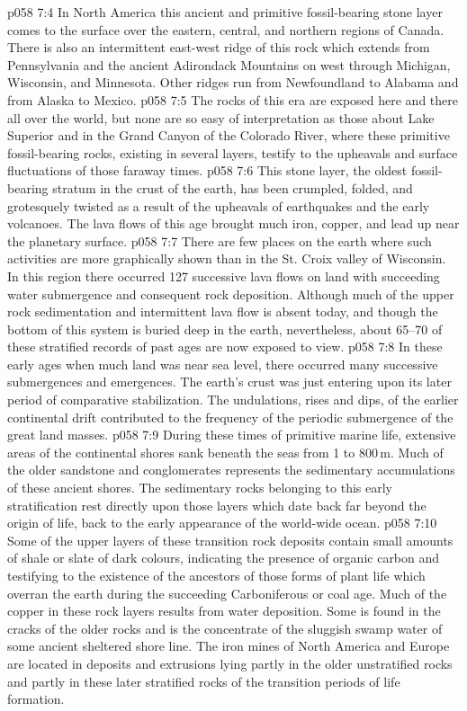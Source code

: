 \vs p058 7:4 In North America this ancient and primitive fossil\hyp{}bearing stone layer comes to the surface over the eastern, central, and northern regions of Canada. There is also an intermittent east\hyp{}west ridge of this rock which extends from Pennsylvania and the ancient Adirondack Mountains on west through Michigan, Wisconsin, and Minnesota. Other ridges run from Newfoundland to Alabama and from Alaska to Mexico.
\vs p058 7:5 The rocks of this era are exposed here and there all over the world, but none are so easy of interpretation as those about Lake Superior and in the Grand Canyon of the Colorado River, where these primitive fossil\hyp{}bearing rocks, existing in several layers, testify to the upheavals and surface fluctuations of those faraway times.
\vs p058 7:6 This stone layer, the oldest fossil\hyp{}bearing stratum in the crust of the earth, has been crumpled, folded, and grotesquely twisted as a result of the upheavals of earthquakes and the early volcanoes. The lava flows of this age brought much iron, copper, and lead up near the planetary surface.
\vs p058 7:7 There are few places on the earth where such activities are more graphically shown than in the St. Croix valley of Wisconsin. In this region there occurred 127 successive lava flows on land with succeeding water submergence and consequent rock deposition. Although much of the upper rock sedimentation and intermittent lava flow is absent today, and though the bottom of this system is buried deep in the earth, nevertheless, about 65--70 of these stratified records of past ages are now exposed to view.
\vs p058 7:8 \pc In these early ages when much land was near sea level, there occurred many successive submergences and emergences. The earth’s crust was just entering upon its later period of comparative stabilization. The undulations, rises and dips, of the earlier continental drift contributed to the frequency of the periodic submergence of the great land masses.
\vs p058 7:9 During these times of primitive marine life, extensive areas of the continental shores sank beneath the seas from 1 to 800\,m. Much of the older sandstone and conglomerates represents the sedimentary accumulations of these ancient shores. The sedimentary rocks belonging to this early stratification rest directly upon those layers which date back far beyond the origin of life, back to the early appearance of the world\hyp{}wide ocean.
\vs p058 7:10 Some of the upper layers of these transition rock deposits contain small amounts of shale or slate of dark colours, indicating the presence of organic carbon and testifying to the existence of the ancestors of those forms of plant life which overran the earth during the succeeding Carboniferous or coal age. Much of the copper in these rock layers results from water deposition. Some is found in the cracks of the older rocks and is the concentrate of the sluggish swamp water of some ancient sheltered shore line. The iron mines of North America and Europe are located in deposits and extrusions lying partly in the older unstratified rocks and partly in these later stratified rocks of the transition periods of life formation.
